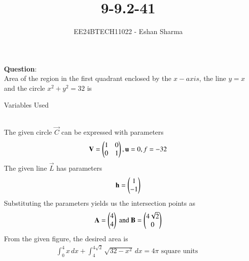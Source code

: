 \documentclass[journal]{IEEEtran}
\begin{document}

\vspace{3cm}

\title{9-9.2-41}
\author{EE24BTECH11022 - Eshan Sharma}
{\let\newpage\relax\maketitle}

\renewcommand{\thefigure}{\theenumi}
\renewcommand{\thetable}{\theenumi}
\setlength{\intextsep}{10pt} %


\renewcommand{\thetable}{\theenumi}

\textbf{Question}:\\
Area of the region in the first quadrant enclosed by the $x-axis$, the line $y = x$ and the circle $x^{2} + y^{2} = 32$ is
\\
\begin{table}[h!]    
  \centering
  
  \caption{Variables Used}
  \label{tab0}
\end{table}
\solution\\
The given circle $\vec{C}$ can be expressed with parameters
\begin{align}
	\mathbf{V} = \begin{pmatrix}1&0\\0&1\end{pmatrix}, \mathbf{u} = 0, f = -32
\end{align}
The given line $\vec{L}$ has parameters
\begin{align}
	\mathbf{h} = \begin{pmatrix}1\\-1\end{pmatrix}
\end{align}
Substituting the parameters yields us the intersection points as
\begin{align}
	\mathbf{A} = \begin{pmatrix}4\\4\end{pmatrix} \text{ and } \mathbf{B} = \begin{pmatrix}4\sqrt{2}\\0\end{pmatrix}
\end{align}
From the given figure, the desired area is
\begin{align}
	\int_{0}^{4} x \, dx + \int_{4}^{4\sqrt{2}} \sqrt{32-x^{2}} \, dx = 4\pi \text{ square units }
\end{align}
\end{document}
